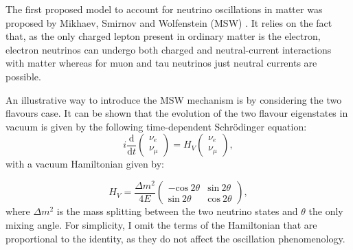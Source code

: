The first proposed model to account for neutrino oscillations in matter was proposed by Mikhaev, Smirnov and Wolfenstein (MSW) \cite{Wolfenstein1977}. It relies on the fact that, as the only charged lepton present in ordinary matter is the electron, electron neutrinos can undergo both charged and neutral-current interactions with matter whereas for muon and tau neutrinos just neutral currents are possible.

An illustrative way to introduce the MSW mechanism is by considering the two flavours case. It can be shown that the evolution of the two flavour eigenstates in vacuum is given by the following time-dependent Schrödinger equation:
\begin{equation}
	i \frac{\mathrm{d}}{\mathrm{d}t} \begin{pmatrix}\nu_{e}\\\nu_{\mu}\end{pmatrix} = H_{V} \begin{pmatrix}\nu_{e}\\\nu_{\mu}\end{pmatrix},
\end{equation}
with a vacuum Hamiltonian given by:

\begin{equation}
	H_{V} = \frac{\Delta m^{2}}{4E} \begin{pmatrix}-\mathrm{cos}~2\theta&\mathrm{sin}~2\theta\\\mathrm{sin}~2\theta&\mathrm{cos}~2\theta\end{pmatrix},
\end{equation}
where $\Delta m^{2}$ is the mass splitting between the two neutrino states and $\theta$ the only mixing angle. For simplicity, I omit the terms of the Hamiltonian that are proportional to the identity, as they do not affect the oscillation phenomenology.

